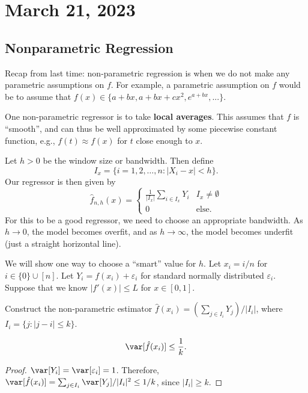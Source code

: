 \section{March 21, 2023}

\subsection{Nonparametric Regression}

Recap from last time: non-parametric regression is when we do not make any parametric assumptions on $f$. For example, a parametric assumption on $f$ would be to assume that $f(x)\in \{a+bx, a+bx+cx^2, e^{a+bx},...\}$. 

One non-parametric regressor is to take \textbf{local averages}. This assumes that $f$ is ``smooth'', and can thus be well approximated by some piecewise constant function, e.g., $f(t)\approx f(x)$ for $t$ close enough to $x$. 

Let $h>0$ be the \ac{window size} or \ac{bandwidth}. Then define 
\[I_x = \{i=1,2,\hdots, n : \vert X_i-x\vert < h\}.\]
Our regressor is then given by 
\[\hat{f}_{n,h}(x) = \begin{cases}
\displaystyle\frac{1}{\vert I_x\vert}\sum_{i\in I_x}Y_i & I_x\neq \emptyset\\
0 & \text{else}.
\end{cases}\]
For this to be a good regressor, we need to choose an appropriate bandwidth. As $h\rightarrow 0$, the model becomes overfit, and as $h\rightarrow \infty$, the model becomes underfit (just a straight horizontal line). 

\begin{example}
\exlabel

We will show one way to choose a ``smart'' value for $h$. Let $x_i=i/n$ for $i\in \{0\}\cup [n]$. Let $Y_i = f(x_i) + \varepsilon_i$ for standard normally distributed $\varepsilon_i$. Suppose that we know $\vert f'(x)\vert\leq L$ for $x\in [0,1]$. 
\end{example}

Construct the non-parametric estimator $\hat{f}(x_i) = (\sum_{j\in I_i}Y_j)/\vert I_i\vert$, where $I_i=\{j : \vert j-i\vert \leq k\}$. 

\begin{theorem}

\[\var[\hat{f}(x_i)]\leq \frac{1}{k}.\]
\end{theorem}

\begin{proof}
$\var[Y_i]=\var[\varepsilon_i]=1$. Therefore, $\var[\hat{f}(x_i)] = \sum_{j\in I_i}\var[Y_j]/\vert I_i\vert^2 \leq 1/k$, since $\vert I_i\vert \geq k$. 
\end{proof}

